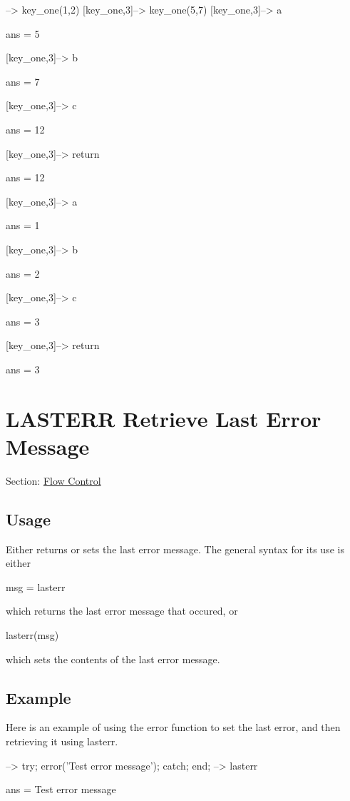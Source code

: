 \begin{DoxyVerbInclude}
--> key_one(1,2)
[key_one,3]--> key_one(5,7)
[key_one,3]--> a

ans = 
 5 

[key_one,3]--> b

ans = 
 7 

[key_one,3]--> c

ans = 
 12 

[key_one,3]--> return

ans = 
 12 

[key_one,3]--> a

ans = 
 1 

[key_one,3]--> b

ans = 
 2 

[key_one,3]--> c

ans = 
 3 

[key_one,3]--> return

ans = 
 3 
\end{DoxyVerbInclude}
 \hypertarget{flow_lasterr}{}\section{L\-A\-S\-T\-E\-R\-R Retrieve Last Error Message}\label{flow_lasterr}
Section\-: \hyperlink{sec_flow}{Flow Control} \hypertarget{vtkwidgets_vtkxyplotwidget_Usage}{}\subsection{Usage}\label{vtkwidgets_vtkxyplotwidget_Usage}
Either returns or sets the last error message. The general syntax for its use is either \begin{DoxyVerb}  msg = lasterr
\end{DoxyVerb}
 which returns the last error message that occured, or \begin{DoxyVerb}  lasterr(msg)
\end{DoxyVerb}
 which sets the contents of the last error message. \hypertarget{variables_struct_Example}{}\subsection{Example}\label{variables_struct_Example}
Here is an example of using the {\ttfamily error} function to set the last error, and then retrieving it using lasterr.


\begin{DoxyVerbInclude}
--> try; error('Test error message'); catch; end;
--> lasterr

ans = 
Test error message
\end{DoxyVerbInclude}


